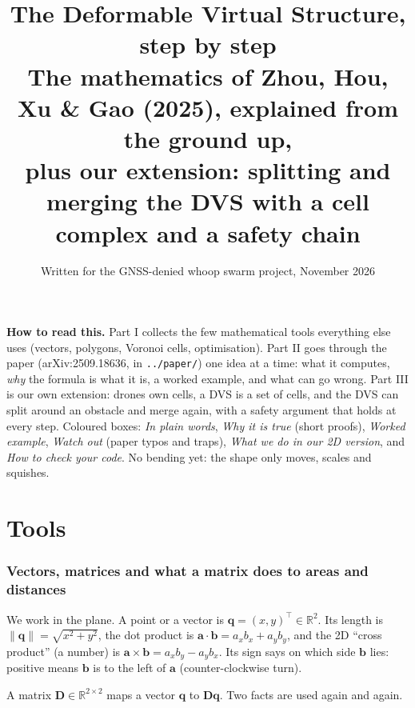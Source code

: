 \documentclass[11pt,a4paper]{article}
\title{\textbf{The Deformable Virtual Structure, step by step}\\[3pt]
\large The mathematics of Zhou, Hou, Xu \& Gao (2025), explained from the ground up,\\
plus our extension: splitting and merging the DVS with a cell complex and a safety chain}
\date{Written for the GNSS-denied whoop swarm project, November 2026}
\newcommand{\vect}[1]{\mathbf{#1}}
\newcommand{\R}{\mathbb{R}}
\newcommand{\T}{^{\top}}
\begin{document}
\maketitle
\vspace{-1em}
\begin{center}
\begin{minipage}{0.9\textwidth}\small
\textbf{How to read this.} Part I collects the few mathematical tools everything else uses (vectors, polygons,
Voronoi cells, optimisation). Part II goes through the paper (arXiv:2509.18636, in \texttt{../paper/}) one idea at
a time: what it computes, \emph{why} the formula is what it is, a worked example, and what can go wrong. Part III is
our own extension: drones own cells, a DVS is a set of cells, and the DVS can split around an obstacle and merge
again, with a safety argument that holds at every step. Coloured boxes: \emph{In plain words}, \emph{Why it is true}
(short proofs), \emph{Worked example}, \emph{Watch out} (paper typos and traps), \emph{What we do in our 2D version},
and \emph{How to check your code}. No bending yet: the shape only moves, scales and squishes.
\end{minipage}
\end{center}

\tableofcontents
\newpage

\part{Tools}

\section{Vectors, matrices and what a matrix does to areas and distances}

We work in the plane. A point or a vector is $\vect{q}=(x,y)\T\in\R^2$. Its length is
$\|\vect{q}\|=\sqrt{x^2+y^2}$, the dot product is $\vect{a}\cdot\vect{b}=a_xb_x+a_yb_y$, and the 2D ``cross
product'' (a number) is $\vect{a}\times\vect{b}=a_xb_y-a_yb_x$. Its sign says on which side $\vect{b}$ lies: positive
means $\vect{b}$ is to the left of $\vect{a}$ (counter-clockwise turn).

A matrix $\vect{D}\in\R^{2\times2}$ maps a vector $\vect{q}$ to $\vect{D}\vect{q}$. Two facts are used again and again.
\end{document}
